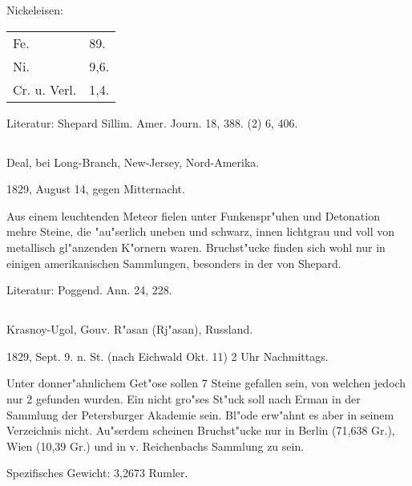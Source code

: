 \documentclass[a4paper, 11pt, oneside]{article}
\begin{document}
Nickeleisen:
\begin{table}[H]
    \centering\swabfamily\Large
    \begin{tabular}{l l}
        Fe. & 89. \\
        Ni. & 9,6. \\
        Cr. u. Verl. & 1,4. \\
    \end{tabular}
\end{table}

\normalsize
Literatur: Shepard Sillim. Amer. Journ. 18, 388. (2) 6, 406.

\subsection{}
\LARGE
\paragraph{}
Deal, bei Long-Branch, New-Jersey, Nord-Amerika.

1829, August 14, gegen Mitternacht.

Aus einem leuchtenden Meteor fielen unter Funkenspr"uhen und Detonation mehre Steine, die "au"serlich uneben und schwarz, innen lichtgrau und voll von metallisch gl"anzenden K"ornern waren. Bruchst"ucke finden sich wohl nur in einigen amerikanischen Sammlungen, besonders in der von Shepard.

Literatur: Poggend. Ann. 24, 228.

\subsection{}
\LARGE
\paragraph{}
Krasnoy-Ugol, Gouv. R"asan (Rj"asan), Russland.

1829, Sept. 9. n. St. (nach Eichwald Okt. 11) 2 Uhr Nachmittags.

Unter donner"ahnlichem Get"ose sollen 7 Steine gefallen sein, von welchen jedoch nur 2 gefunden wurden. Ein nicht gro"ses St"uck soll nach Erman in der Sammlung der Petersburger Akademie sein. Bl"ode erw"ahnt es aber in seinem Verzeichnis nicht. Au"serdem scheinen Bruchst"ucke nur in Berlin (71,638 Gr.), Wien (10,39 Gr.) und in v. Reichenbachs Sammlung zu sein.

Spezifisches Gewicht: 3,2673 Rumler.
\end{document}
